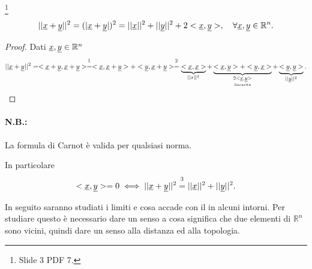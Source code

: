 \begin{proposition}
    \footnote{Slide 3 PDF 7.}
    \begin{equation}\label{eq:formula_carnot}
        ||\uline x+ \uline y||^2=(|\uline x+ \uline y|)^2=||\uline x||^2+||\uline y||^2+2<\uline x,\uline y>,\quad\forall \uline x,\uline y\in\mathbb R^n.
    \end{equation}
\end{proposition}
\begin{proof}
    Dati $\uline x,\uline y\in\mathbb R^n$
    \begin{equation*}
        ||\uline x+\uline y||^2=<\uline x+\uline y,\uline x+\uline y> \overset{\footnotemark}{=} <\uline x,\uline x+\uline y> + <\uline y,\uline x+\uline y> \overset{\footnotemark}{=} \underbrace{<\uline x,\uline x>}_{||x||^2} + \underbrace{<\uline x,\uline y>+<\uline y,\uline x>}_{\underset{\text{linearità}}{2<\uline x,\uline y>}}+\underbrace{<\uline y,\uline y>}_{||\uline y||^2}.
    \end{equation*}
\end{proof}

\addtocounter{footnote}{-1}


\paragraph{N.B.:} La formula di Carnot è valida per qualsiasi norma.

\begin{remark}
    In particolare
    \begin{equation*}
        <\uline x, \uline y> =0 \iff ||\uline x+\uline y||^2 \overset{\footnotemark}{=}||\uline x||^2+||\uline y||^2.
    \end{equation*}
\end{remark}

In seguito saranno studiati i limiti e cosa accade con il in alcuni intorni. Per studiare questo è necessario dare un senso a cosa significa che due elementi di $\mathbb R^n$ sono vicini, quindi dare un senso alla distanza ed alla topologia.

